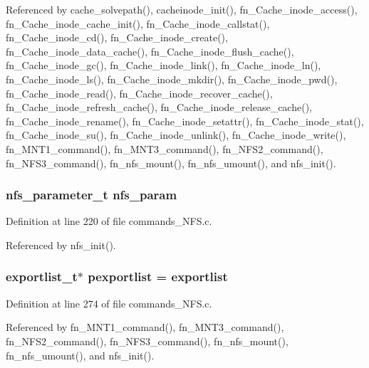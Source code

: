 Referenced by cache\_\-solvepath(), cacheinode\_\-init(), fn\_\-Cache\_\-inode\_\-access(), fn\_\-Cache\_\-inode\_\-cache\_\-init(), fn\_\-Cache\_\-inode\_\-callstat(), fn\_\-Cache\_\-inode\_\-cd(), fn\_\-Cache\_\-inode\_\-create(), fn\_\-Cache\_\-inode\_\-data\_\-cache(), fn\_\-Cache\_\-inode\_\-flush\_\-cache(), fn\_\-Cache\_\-inode\_\-gc(), fn\_\-Cache\_\-inode\_\-link(), fn\_\-Cache\_\-inode\_\-ln(), fn\_\-Cache\_\-inode\_\-ls(), fn\_\-Cache\_\-inode\_\-mkdir(), fn\_\-Cache\_\-inode\_\-pwd(), fn\_\-Cache\_\-inode\_\-read(), fn\_\-Cache\_\-inode\_\-recover\_\-cache(), fn\_\-Cache\_\-inode\_\-refresh\_\-cache(), fn\_\-Cache\_\-inode\_\-release\_\-cache(), fn\_\-Cache\_\-inode\_\-rename(), fn\_\-Cache\_\-inode\_\-setattr(), fn\_\-Cache\_\-inode\_\-stat(), fn\_\-Cache\_\-inode\_\-su(), fn\_\-Cache\_\-inode\_\-unlink(), fn\_\-Cache\_\-inode\_\-write(), fn\_\-MNT1\_\-command(), fn\_\-MNT3\_\-command(), fn\_\-NFS2\_\-command(), fn\_\-NFS3\_\-command(), fn\_\-nfs\_\-mount(), fn\_\-nfs\_\-umount(), and nfs\_\-init().
\subsubsection{\setlength{\rightskip}{0pt plus 5cm}nfs\_\-parameter\_\-t {\bf nfs\_\-param}}\label{commands__NFS_8c_a2}




Definition at line 220 of file commands\_\-NFS.c.

Referenced by nfs\_\-init().
\subsubsection{\setlength{\rightskip}{0pt plus 5cm}exportlist\_\-t$\ast$ {\bf pexportlist} = {\bf exportlist}}\label{commands__NFS_8c_a9}




Definition at line 274 of file commands\_\-NFS.c.

Referenced by fn\_\-MNT1\_\-command(), fn\_\-MNT3\_\-command(), fn\_\-NFS2\_\-command(), fn\_\-NFS3\_\-command(), fn\_\-nfs\_\-mount(), fn\_\-nfs\_\-umount(), and nfs\_\-init().
